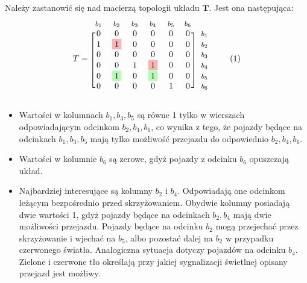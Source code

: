 \documentclass[12pt]{book}
\theoremstyle{plain}
\newcommand\addtag{\refstepcounter{equation}
\renewcommand{\labelenumii}{\theenumii}
\renewcommand{\theenumii}{\theenumi.\arabic{enumii}.}
\tag{\theequation}}
\begin{document}
Należy zastanowić się nad macierzą topologii układu $\textbf{T}$. Jest ona następująca:
\begin{equation*}
T=
\begin{blockarray}{*{6}{c} l}
\begin{block}{*{6}{>{$\footnotesize}c<{$}} l}
$b_1$ & $b_2$ & $b_3$ & $b_4$ & $b_5$ & $b_6$ \\
\end{block}
\begin{block}{[*{6}{c}]>{$\footnotesize}l<{$}}
0 & 0 & 0 & 0 & 0 & 0 & $b_1$ \\
1 & \colorbox{red!30}{1} & 0 & 0 & 0 & 0 & $b_2$ \\
0 & 0 & 0 & 0 & 0 & 0 & $b_3$ \\
0 & 0 & 1 & \colorbox{red!30}{1} & 0 & 0 & $b_4$ \\
0 & \colorbox{green!30}{1} & 0 & \colorbox{green!30}{1} & 0 & 0 & $b_5$ \\
0 & 0 & 0 & 0 & 1 & 0 & $b_6$ \\
\end{block}
\end{blockarray} \addtag
\end{equation*}
\begin{itemize}
	\item Wartości w kolumnach $b_1,b_3,b_5$ są równe 1 tylko w wierszach odpowiadającym odcinkom $b_2,b_4,b_6$, co wynika z tego, że pojazdy będące na odcinkach $b_1,b_3,b_5$ mają tylko możliwość przejazdu do odpowiednio $b_2,b_4,b_6$.
	\item Wartości w kolumnie $b_6$ są zerowe, gdyż pojazdy z odcinku $b_6$ opuszczają układ.
	\item Najbardziej interesujące są kolumny $b_2$ i $b_4$. Odpowiadają one odcinkom leżącym bezpośrednio przed skrzyżowaniem. Obydwie kolumny posiadają dwie wartości 1, gdyż pojazdy będące na odcinkach $b_2,b_4$ mają dwie możliwości przejazdu. Pojazdy będące na odcinku $b_2$ mogą przejechać przez skrzyżowanie i wjechać na $b_5$, albo pozostać dalej na $b_2$ w przypadku czerwonego światła. Analogiczna sytuacja dotyczy pojazdów na odcinku $b_4$. \colorbox{green!30}{Zielone} i \colorbox{red!30}{czerwone} tło określają przy jakiej sygnalizacji świetlnej opisany przejazd jest możliwy.
\end{itemize}
\end{document}
